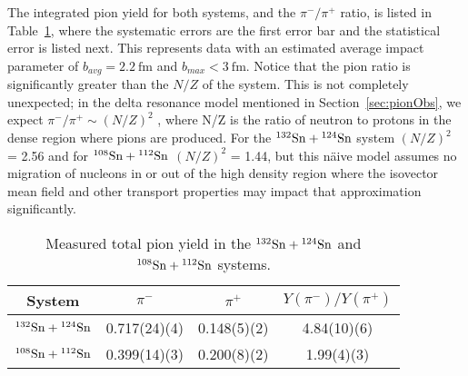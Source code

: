 The integrated pion yield for both systems, and the $\pi^-/\pi^+$ ratio, is listed in Table~\ref{tb:pionyield}, where the systematic errors are the first error bar and the statistical error is listed next. This represents data with an estimated average impact parameter of $b_{avg} = \SI{2.2}{\femto\metre}$ and $b_{max} < \SI{3}{\femto\metre}$. Notice that the pion ratio is significantly greater than the $N/Z$ of the system.  This is not completely unexpected; in the delta resonance model mentioned in Section~\ref{sec:pionObs}, we expect  $\pi^-/\pi^+ \sim (N/Z)^2$ \cite{baoan_piprod1,baoan_piprod2}, where N/Z is the ratio of neutron to protons in the dense region where pions are produced. For the ${}^{132}\mathrm{Sn} + {}^{124}\mathrm{Sn}$ system $(N/Z)^2$ = 2.56 and for ${}^{108}\mathrm{Sn} + {}^{112}\mathrm{Sn}$ $(N/Z)^2$ = 1.44, but this n\"aive model assumes no migration of nucleons in or out of the high density region where the isovector mean field and other transport properties may impact that approximation significantly. 



\begin{table*}\centering
{}
\begin{tabular}{@{}cccc@{}}\toprule
System & $\pi^-$ & $\pi^+$ & $Y(\pi^-)/Y(\pi^+)$  \\
\midrule
${}^{132}\mathrm{Sn} + {}^{124}\mathrm{Sn}$ & 0.717(24)(4) & 0.148(5)(2) & 4.84(10)(6)  \\
${}^{108}\mathrm{Sn} + {}^{112}\mathrm{Sn}$ & 0.399(14)(3) & 0.200(8)(2) & 1.99(4)(3)  \\
\bottomrule
\end{tabular}
\caption{Measured total pion yield in the ${}^{132}\mathrm{Sn} + {}^{124}\mathrm{Sn}$ and ${}^{108}\mathrm{Sn} + {}^{112}\mathrm{Sn}$ systems.}
\label{tb:pionyield}
\end{table*}


